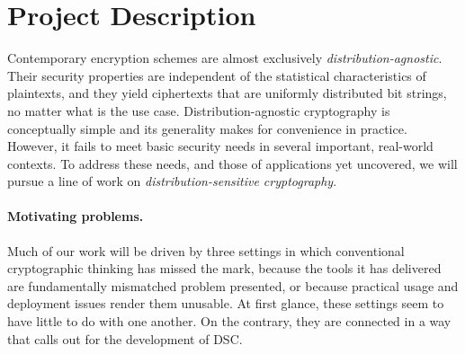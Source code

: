 \section{Project Description}
\label{sec:intro}

Contemporary encryption schemes are almost exclusively {\em
distribution-agnostic}. Their security properties are independent of the
statistical characteristics of plaintexts, and they yield ciphertexts that are
uniformly distributed bit strings, no matter what is the use case.
Distribution-agnostic cryptography is conceptually simple and its generality
makes for convenience in practice.  However, it fails to meet basic security needs in
several important, real-world contexts.  To address these needs, and
those of applications yet uncovered, we will pursue a line of work on
\emph{distribution-sensitive cryptography}.  





\paragraph{Motivating problems.}  Much of our work will be driven 
by three settings in which conventional cryptographic thinking
has missed the mark, because the tools it has delivered are
fundamentally mismatched problem presented, or because practical usage
and deployment issues render them unusable.
At first glance, these settings seem to have little to do with one another. 
On the contrary, they are connected in a way that calls out for the development of DSC.
  
